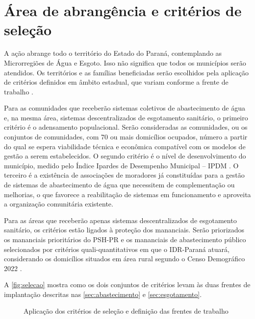 \section{Área de abrangência e critérios de seleção}
\label{sec:area}

A ação abrange todo o território do Estado do Paraná, contemplando as
Microrregiões de Água e Esgoto. Isso não significa que todos os municípios
serão atendidos. Os territórios e as famílias beneficiadas serão escolhidos
pela aplicação de critérios definidos em âmbito estadual, que variam conforme
a frente de trabalho \cite{mop2026}.

Para as comunidades que receberão sistemas coletivos de abastecimento de água
e, na mesma área, sistemas descentralizados de esgotamento sanitário, o
primeiro critério é o adensamento populacional. Serão consideradas as
comunidades, ou os conjuntos de comunidades, com 70 ou mais domicílios
ocupados, número a partir do qual se espera viabilidade técnica e econômica
compatível com os modelos de gestão a serem estabelecidos. O segundo critério
é o nível de desenvolvimento do município, medido pelo Índice Ipardes de
Desempenho Municipal -- IPDM \cite{ipdm}. O terceiro é a existência de
associações de moradores já constituídas para a gestão de sistemas de
abastecimento de água que necessitem de complementação ou melhorias, o que
favorece a reabilitação de sistemas em funcionamento e aproveita a
organização comunitária existente.

Para as áreas que receberão apenas sistemas descentralizados de esgotamento
sanitário, os critérios estão ligados à proteção dos mananciais. Serão
priorizados os mananciais prioritários do PSH-PR e os mananciais de
abastecimento público selecionados por critérios quali-quantitativos em que o
IDR-Paraná atuará, considerando os domicílios situados em área rural segundo o
Censo Demográfico 2022 \cite{ibge2022}.

A \autoref{fig:selecao} mostra como os dois conjuntos de critérios levam às
duas frentes de implantação descritas nas \autoref{sec:abastecimento} e
\ref{sec:esgotamento}.

\begin{figure}[htbp]
  \centering
  \caption{Aplicação dos critérios de seleção e definição das frentes de trabalho}
  \label{fig:selecao}
\end{figure}


